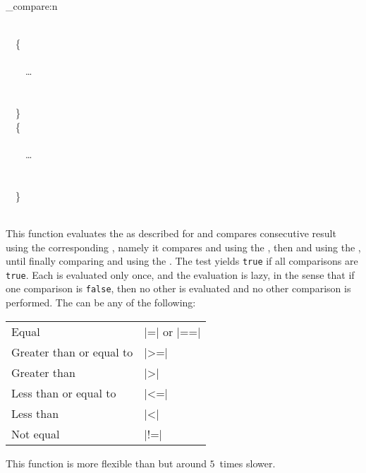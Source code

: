 \documentclass[uplatex,dvipdfmx,full,kernel]{wtpl3doc}
\begin{document}
\begin{documentation}
\begin{function}[updated = 2013-01-13, EXP, pTF]{\int_compare:n}
  \begin{syntax}
     \\
    ~~\{ \\
    ~~~~  \\
    ~~~~\ldots{} \\
    ~~~~  \\
    ~~~~ \\
    ~~\} \\
    ~~\{ \\
    ~~~~  \\
    ~~~~\ldots{} \\
    ~~~~  \\
    ~~~~ \\
    ~~\} \\
    ~~ 
  \end{syntax}
  This function evaluates the  as described
  for  and compares consecutive result using the
  corresponding , namely it compares 
  and  using the , then
   and  using the ,
  until finally comparing  and 
  using the .  The test yields \texttt{true} if all
  comparisons are \texttt{true}.  Each  is
  evaluated only once, and the evaluation is lazy, in the sense that
  if one comparison is \texttt{false}, then no other  is evaluated and no other comparison is performed.
  The  can be any of the following:
  \begin{center}
    \begin{tabular}{ll}
      Equal                    & |=| or |==| \\
      Greater than or equal to & |>=|        \\
      Greater than             & |>|         \\
      Less than or equal to    & |<=|        \\
      Less than                & |<|         \\
      Not equal                & |!=|        \\
    \end{tabular}
  \end{center}
  This function is more flexible than  but
  around $5$~times slower.
\end{function}


\end{documentation}
\end{document}
